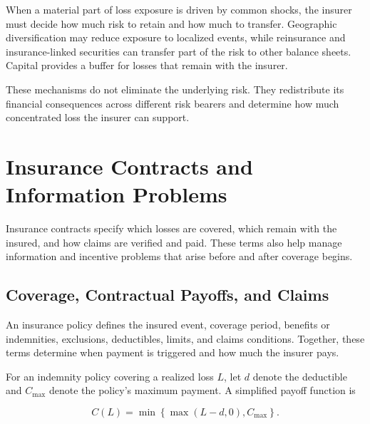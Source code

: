 \begin{tcolorbox}[
enhanced,
breakable,
colback=white,
colframe=FinanceBlue,
boxrule=0.7pt,
sharp corners,
borderline west={2.2pt}{0pt}{FinanceBlue},
title=\textbf{Financial Perspective: When Pooling Is Not Enough},
coltitle=white,
colbacktitle=FinanceBlue,
fonttitle=\bfseries,
before skip=1.2em,
after skip=1.2em
]

When a material part of loss exposure is driven by common shocks, the insurer must decide how much risk to retain and how much to transfer. Geographic diversification may reduce exposure to localized events, while reinsurance and insurance-linked securities can transfer part of the risk to other balance sheets. Capital provides a buffer for losses that remain with the insurer.

These mechanisms do not eliminate the underlying risk. They redistribute its financial consequences across different risk bearers and determine how much concentrated loss the insurer can support.

\end{tcolorbox}


\section{Insurance Contracts and Information Problems}

Insurance contracts specify which losses are covered, which remain with the insured, and how claims are verified and paid. These terms also help manage information and incentive problems that arise before and after coverage begins.


\subsection{Coverage, Contractual Payoffs, and Claims}

An insurance policy defines the insured event, coverage period, benefits or indemnities, exclusions, deductibles, limits, and claims conditions. Together, these terms determine when payment is triggered and how much the insurer pays.

For an indemnity policy covering a realized loss $L$, let
$d$ denote the deductible and $C_{\max}$ denote the policy's
maximum payment. A simplified payoff function is

\begin{equation}
C(L)=\min\left\{\max(L-d,0), C_{\max}\right\}.
\label{eq:ch15-insurance-payoff}
\end{equation}

